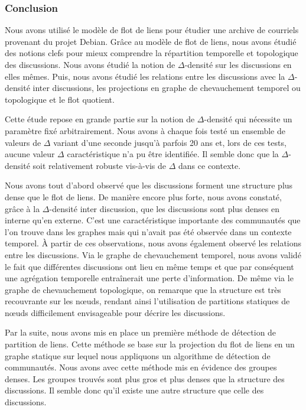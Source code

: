 \subsubsection{Conclusion}

Nous avons utilisé le modèle de flot de liens pour étudier une archive de courriels provenant du projet Debian.
Grâce au modèle de flot de liens, nous avons étudié des notions clefs pour mieux comprendre la répartition temporelle et topologique des discussions.
Nous avons étudié la notion de $\Delta$-densité sur les discussions en elles mêmes.
Puis, nous avons étudié les relations entre les discussions avec la $\Delta$-densité inter discussions, les projections en graphe de chevauchement temporel ou topologique et le flot quotient.

Cette étude repose en grande partie sur la notion de $\Delta$-densité qui nécessite un paramètre fixé arbitrairement.
Nous avons à chaque fois testé un ensemble de valeurs de $\Delta$ variant d'une seconde jusqu'à parfois 20 ans et, lors de ces tests, aucune valeur $\Delta$ caractéristique n'a pu être identifiée.
Il semble donc que la $\Delta$-densité soit relativement robuste vis-à-vis de $\Delta$ dans ce contexte.

Nous avons tout d'abord observé que les discussions forment une structure plus dense que le flot de liens.
De manière encore plus forte, nous avons constaté, grâce à la $\Delta$-densité inter discussion, que les discussions sont plus denses en interne qu'en externe.
C'est une caractéristique importante des communautés que l'on trouve dans les graphes mais qui n'avait pas été observée dans un contexte temporel.
\`A partir de ces observations, nous avons également observé les relations entre les discussions.
Via le graphe de chevauchement temporel, nous avons validé le fait que différentes discussions ont lieu en même temps et que par conséquent une agrégation temporelle entraînerait une perte d'information.
De même via le graphe de chevauchement topologique, on remarque que la structure est très recouvrante sur les n\oe{}uds, rendant ainsi l'utilisation de partitions statiques de n\oe{}uds difficilement envisageable pour décrire les discussions.


Par la suite, nous avons mis en place un première méthode de détection de partition de liens.
Cette méthode se base sur la projection du flot de liens en un graphe statique sur lequel nous appliquons un algorithme de détection de communautés.
Nous avons avec cette méthode mis en évidence des groupes denses.
Les groupes trouvés sont plus gros et plus denses que la structure des discussions.
Il semble donc qu'il existe une autre structure que celle des discussions.

